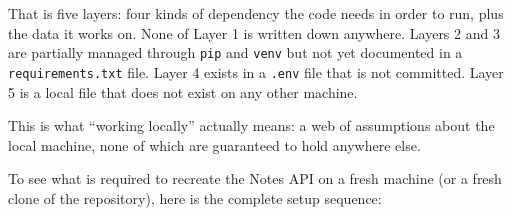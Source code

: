 \noindent{}That is five layers: four kinds of dependency the code needs in order to run, plus the data it works on. None of Layer 1 is written down anywhere. Layers 2 and 3 are partially managed through \texttt{pip} and \texttt{venv} but not yet documented in a \texttt{requirements.txt} file. Layer 4 exists in a \texttt{.env} file that is not committed. Layer 5 is a local file that does not exist on any other machine.

This is what ``working locally'' actually means: a web of assumptions about the local machine, none of which are guaranteed to hold anywhere else.

\label{06-local-dependencies:setting-up-the-notes-api-from-scratch}

To see what is required to recreate the Notes API on a fresh machine (or a fresh clone of the repository), here is the complete setup sequence:

\begin{codebox}

\begin{Shaded}
\begin{Highlighting}[]
\KeywordTok{\&\&} 

 



 \OperatorTok{\textgreater{}}

\end{Highlighting}
\end{Shaded}

\end{codebox}

